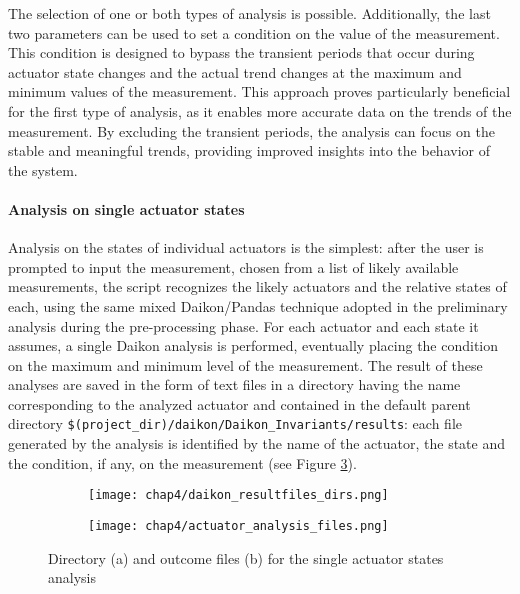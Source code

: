\noindent The selection of one or both types of analysis is possible. Additionally, the last two parameters can be used to set a condition on the value of the measurement. This condition is designed to bypass the transient periods that occur during actuator state changes and the actual trend changes at the maximum and minimum values of the measurement.\newline
This approach proves particularly beneficial for the first type of analysis, as it enables more accurate data on the trends of the measurement. By excluding the transient periods, the analysis can focus on the stable and meaningful trends, providing improved insights into the behavior of the system.

\paragraph{Analysis on single actuator states}
\label{par:4_single_actuator_states_analysis}
Analysis on the states of individual actuators is the simplest: after the user is prompted to input the measurement, chosen from a list of likely available measurements, the script recognizes the likely actuators and the relative states of each, using the same mixed Daikon/Pandas technique adopted in the preliminary analysis during the pre-processing phase.\newline
For each actuator and each state it assumes, a single Daikon analysis is performed, eventually placing the condition on the maximum and minimum level of the measurement.\newline 
The result of these analyses are saved in the form of text files in a directory having the name corresponding to the analyzed actuator and contained in the default parent directory \texttt{\$(project\_dir)/daikon/Daikon\_Invariants/results}: each file generated by the analysis is identified by the name of the actuator, the state and the condition, if any, on the measurement (see Figure \ref{fig:4_daikon_simpleanalysis_dirfiles}).

\begin{figure}[ht]
	\centering
	\begin{subfigure}{0.48\textwidth}
		\texttt{[image: chap4/daikon\_resultfiles\_dirs.png]}
		\caption{}
		\label{subfig:4_daikon_results_dir}
	\end{subfigure}
	\hfill
	\begin{subfigure}{0.48\textwidth}
		\texttt{[image: chap4/actuator\_analysis\_files.png]}
		\caption{}
		\label{subfig:4_daikon_results_file}
	\end{subfigure}
	\caption{Directory (a) and outcome files (b) for the single actuator states analysis}
	\label{fig:4_daikon_simpleanalysis_dirfiles}
\end{figure}

